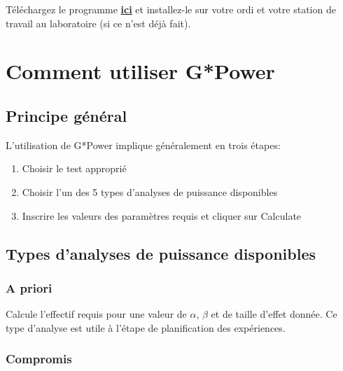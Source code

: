 \documentclass[12pt,]{book}
\makeatletter
\providecommand{\tightlist}{%
  \setlength{\itemsep}{0pt}\setlength{\parskip}{0pt}}
\newenvironment{kframe}{%
\medskip{}
\setlength{\fboxsep}{.8em}
\def\at@end@of@kframe{}%
\ifinner\ifhmode%
 \def\at@end@of@kframe{\end{minipage}}%
 \begin{minipage}{\columnwidth}%
\fi\fi%
\def\FrameCommand##1{\hskip\@totalleftmargin \hskip-\fboxsep
\colorbox{incolor}{##1}\hskip-\fboxsep
    \hskip-\linewidth \hskip-\@totalleftmargin \hskip\columnwidth}%
\MakeFramed {\advance\hsize-\width
  \@totalleftmargin\z@ \linewidth\hsize
  \@setminipage}}%
{\par\unskip\endMakeFramed%
\at@end@of@kframe}
\newenvironment{rmdblock}[1]
 {
 \begin{itemize}
 \renewcommand{\labelitemi}{
   \raisebox{-.7\height}[0pt][0pt]{
     {\setkeys{Gin}{width=3em,keepaspectratio}\texttt{[image: images/\#1]}}
   }
 }
 \begin{kframe}
 \setlength{\fboxsep}{1em}
 \item
 }
 {
 \end{kframe}
 \end{itemize}
 }
\newenvironment{rmdcode}
  {\begin{rmdblock}{screen}}
  {\end{rmdblock}}
\makeatother
\begin{document}
\begin{rmdcode}
Téléchargez le programme \textbf{\href{https://www.psychologie.hhu.de/arbeitsgruppen/allgemeine-psychologie-und-arbeitspsychologie/gpower.html}{ici}} et installez-le sur votre ordi et votre station de travail au laboratoire (si ce n'est déjà fait).
\end{rmdcode}

\hypertarget{comment-utiliser-gpower}{%
\section{Comment utiliser G*Power}\label{comment-utiliser-gpower}}

\hypertarget{principe-guxe9nuxe9ral}{%
\subsection{Principe général}\label{principe-guxe9nuxe9ral}}

L'utilisation de G*Power implique généralement en trois étapes:

\begin{enumerate}
\def\labelenumi{\arabic{enumi}.}
\tightlist
\item
  Choisir le test approprié
\item
  Choisir l'un des 5 types d'analyses de puissance disponibles
\item
  Inscrire les valeurs des paramètres requis et cliquer sur Calculate
\end{enumerate}

\hypertarget{types-danalyses-de-puissance-disponibles}{%
\subsection{Types d'analyses de puissance disponibles}\label{types-danalyses-de-puissance-disponibles}}

\hypertarget{a-priori}{%
\subsubsection*{A priori}\label{a-priori}}

Calcule l'effectif requis pour une valeur de \(\alpha\), \(\beta\) et de taille d'effet donnée.
Ce type d'analyse est utile à l'étape de planification des expériences.

\hypertarget{compromis}{%
\subsubsection*{Compromis}\label{compromis}}
\end{document}
